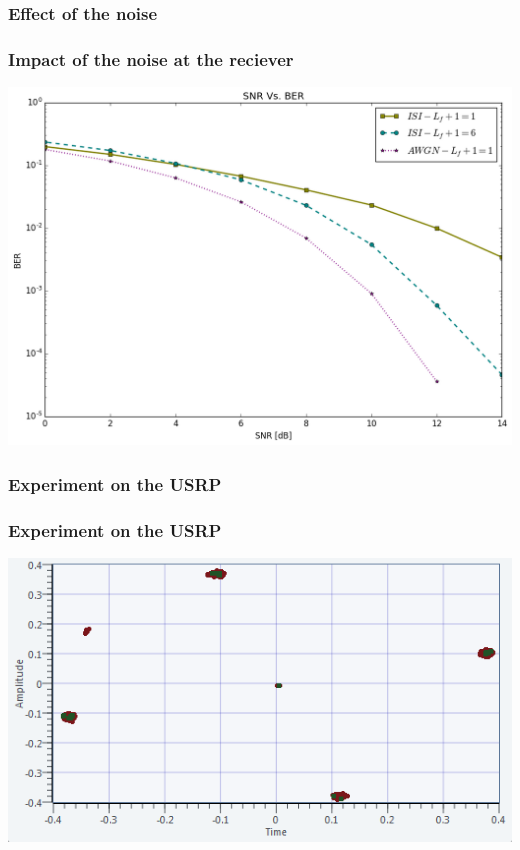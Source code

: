 \documentclass[11pt]{beamer}
\begin{document}
\subsubsection{Effect of the noise}
\begin{frame}
\frametitle{Impact of the noise at the reciever}
\includegraphics[width=.9\linewidth]{img/SNR}
\end{frame}
\subsubsection{Experiment on the USRP}
\begin{frame}
\frametitle{Experiment on the USRP}
\includegraphics[width=.9\linewidth]{img/USRP-Rotate}
\end{frame}
\end{document}

